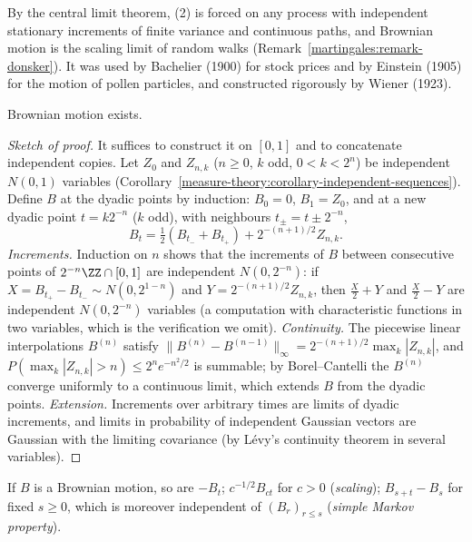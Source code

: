 By the central limit theorem, (2) is forced on any process with independent stationary increments of finite variance and continuous paths, and Brownian motion is the scaling limit of random walks
(Remark~\ref{martingales:remark-donsker}). It was used by Bachelier (1900) for stock prices and by Einstein (1905) for the motion of pollen particles, and constructed rigorously by Wiener (1923).

\begin{theorem}\label{martingales:theorem-brownian-existence}
Brownian motion exists.
\end{theorem}

\begin{proof}[Sketch of proof]
It suffices to construct it on $[0, 1]$ and to concatenate independent copies. Let $Z_0$ and $Z_{n,k}$ ($n \geq 0$, $k$ odd, $0 < k < 2^n$) be independent $N(0, 1)$ variables
(Corollary~\ref{measure-theory:corollary-independent-sequences}). Define $B$ at the dyadic points by induction: $B_0 = 0$, $B_1 = Z_0$, and at a new dyadic point $t = k2^{-n}$ ($k$ odd), with neighbours $t_\pm = t \pm 2^{-n}$,
\[
B_t = \tfrac12(B_{t_-} + B_{t_+}) + 2^{-(n+1)/2}Z_{n,k}.
\]
\emph{Increments.} Induction on $n$ shows that the increments of $B$ between consecutive points of $2^{-n}\ZZ \cap [0, 1]$ are independent $N(0, 2^{-n})$: if $X = B_{t_+} - B_{t_-} \sim N(0, 2^{1-n})$ and $Y = 2^{-(n+1)/2}Z_{n,k}$, then
$\frac X2 + Y$ and $\frac X2 - Y$ are independent $N(0, 2^{-n})$ variables (a computation with characteristic functions in two variables, which is the verification we omit). \emph{Continuity.} The piecewise linear interpolations
$B^{(n)}$ satisfy $\|B^{(n)} - B^{(n-1)}\|_\infty = 2^{-(n+1)/2}\max_k|Z_{n,k}|$, and $P(\max_k|Z_{n,k}| > n) \leq 2^ne^{-n^2/2}$ is summable; by Borel--Cantelli the $B^{(n)}$ converge uniformly to a continuous limit, which extends $B$ from
the dyadic points. \emph{Extension.} Increments over arbitrary times are limits of dyadic increments, and limits in probability of independent Gaussian vectors are Gaussian with the limiting covariance (by L\'evy's continuity
theorem in several variables).
\end{proof}

\begin{proposition}[Invariances]\label{martingales:proposition-brownian-invariance}
If $B$ is a Brownian motion, so are $-B_t$; $c^{-1/2}B_{ct}$ for $c > 0$ (\emph{scaling}); $B_{s+t} - B_s$ for fixed $s \geq 0$, which is moreover independent of $(B_r)_{r \leq s}$ (\emph{simple Markov property}).
\end{proposition}

